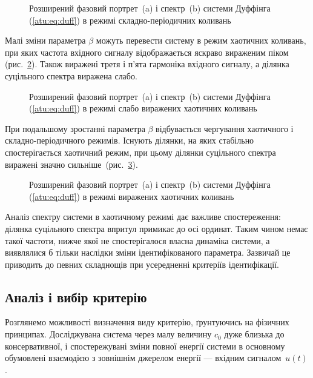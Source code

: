 \begin{figure}[ht!]
  \caption{Розширений фазовий портрет~(a) і спектр~(b) системи Дуффінга (\ref{atu:eq:duff}) в режимі складно-періодичних коливань}
\label{atu:f:duff_phase_f_reg}
\end{figure}

Малі зміни параметра
$ \beta $ можуть перевести систему в режим хаотичних коливань, при
яких частота вхідного сигналу відображається яскраво вираженим піком
(рис.~\ref{atu:f:duff_phase_f_chaos1}). Також виражені третя і п'ята гармоніка
вхідного сигналу, а ділянка суцільного спектра виражена слабо.

\begin{figure}[ht!]
  \caption{Розширений фазовий портрет~(a) і спектр~(b) системи Дуффінга (\ref{atu:eq:duff}) в режимі слабо виражених хаотичних коливань}
\label{atu:f:duff_phase_f_chaos1}
\end{figure}


При подальшому зростанні параметра
$\beta$ відбувається чергування хаотичного і складно-періодичного
режимів. Існують ділянки, на яких стабільно спостерігається
хаотичний режим, при цьому ділянки суцільного спектра виражені значно
сильніше~(рис.~\ref{atu:f:duff_phase_f_chaos2}).

\begin{figure}[ht!]
  \caption{Розширений фазовий портрет~(a) і спектр~(b) системи Дуффінга (\ref{atu:eq:duff}) в режимі виражених хаотичних коливань}
\label{atu:f:duff_phase_f_chaos2}
\end{figure}

Аналіз спектру системи в хаотичному режимі дає важливе
спостереження: ділянка суцільного спектра впритул примикає
до осі ординат. Таким чином немає такої частоти, нижче якої
не спостерігалося власна динаміка системи, а виявлялися б
тільки наслідки зміни ідентифікованого параметра.
Зазвичай це приводить до певних
складнощів при усередненні критеріїв ідентифікації.


\subsection{Аналіз і вибір критерію} %

Розглянемо можливості визначення виду критерію, ґрунтуючись на
фізичних принципах. Досліджувана система через малу величину
$c_0$ дуже близька до консервативної, і спостережувані зміни
повної енергії системи в основному обумовлені взаємодією з
зовнішнім джерелом енергії --- вхідним сигналом~$u(t)$.

